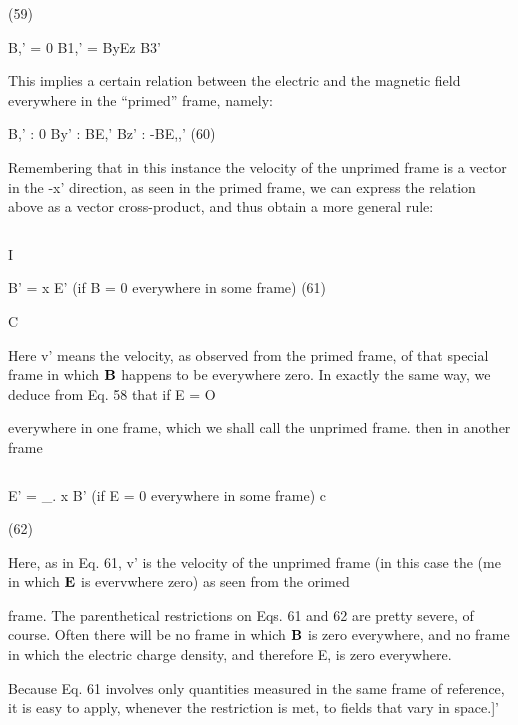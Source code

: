 (59)

B,' = 0 B1,' = ByEz B3'

This implies a certain relation between the electric and the magnetic
field everywhere in the ``primed'' frame, namely:

\begin{equation}
\end{equation}
B,' : 0 By' : BE,' Bz' : -BE,,' (60)

Remembering that in this instance the velocity of the unprimed frame
is a vector in the -x' direction, as seen in the primed frame, we can
express the relation above as a vector cross-product, and thus obtain
a more general rule:

\begin{equation}
\end{equation}
    
  

I

B' =  x E' (if B = 0 everywhere in some frame) (61)

C

 

Here v' means the velocity, as observed from the primed frame, of
that special frame in which $\mathbf{B}$ happens to be everywhere zero.
In exactly the same way, we deduce from Eq. 58 that if E = O

everywhere in one frame, which we shall call the unprimed frame.
then in another frame

 
   
\begin{equation}
\end{equation}

  
 

E' = _.  x B' (if E = 0 everywhere in some frame)
c

(62)

 

Here, as in Eq. 61, v' is the velocity of the unprimed frame (in this
case the (me in which $\mathbf{E}$ is evervwhere zero) as seen from the orimed

frame. The parenthetical restrictions on Eqs. 61 and 62 are pretty
severe, of course. Often there will be no frame in which $\mathbf{B}$ is zero
everywhere, and no frame in which the electric charge density, and
therefore E, is zero everywhere.

Because Eq. 61 involves only quantities measured in the same
frame of reference, it is easy to apply, whenever the restriction is
met, to fields that vary in space.]'

